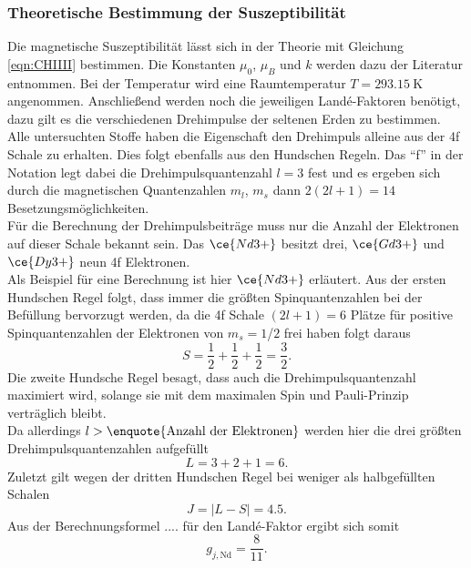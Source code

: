 \subsubsection{Theoretische Bestimmung der Suszeptibilität}

Die magnetische Suszeptibilität lässt sich in der Theorie mit Gleichung \eqref{eqn:CHIIII} bestimmen. Die Konstanten $\mu_0$, $\mu_B$ und $k$ werden dazu der Literatur \cite{lit2} entnommen.
Bei der Temperatur wird eine Raumtemperatur $T = \SI{293.15}{\kelvin}$ angenommen.
Anschließend werden noch die jeweiligen Landé-Faktoren benötigt, dazu gilt es die verschiedenen Drehimpulse der seltenen Erden zu bestimmen. Alle untersuchten Stoffe haben die Eigenschaft
den Drehimpuls alleine aus der 4f Schale zu erhalten. Dies folgt ebenfalls aus den Hundschen Regeln. Das \enquote{f} in der Notation legt dabei die Drehimpulsquantenzahl $l = 3$ fest und es ergeben sich
durch die magnetischen Quantenzahlen $m_l$, $m_s$ dann $2(2l+1) = 14$ Besetzungsmöglichkeiten. 
\\
Für die Berechnung der Drehimpulsbeiträge muss nur die Anzahl der Elektronen auf dieser Schale bekannt sein. Das $\ce{Nd3+}$ besitzt drei, $\ce{Gd3+}$ und $\ce{Dy3+}$ neun 4f Elektronen.
\\
Als Beispiel für eine Berechnung ist hier $\ce{Nd3+}$ erläutert.
Aus der ersten Hundschen Regel folgt, dass immer die größten Spinquantenzahlen bei der Befüllung bervorzugt werden, da die 4f Schale $(2l+1) = 6$ Plätze für positive Spinquantenzahlen der Elektronen
von $m_s = 1$/$2$ frei haben folgt daraus
\begin{equation}
S = \frac{1}{2} + \frac{1}{2} + \frac{1}{2} =  \frac{3}{2}.
\end{equation}
Die zweite Hundsche Regel besagt, dass auch die Drehimpulsquantenzahl maximiert wird, solange sie mit dem maximalen Spin und Pauli-Prinzip verträglich bleibt. 
\\
Da allerdings $l > \text{\enquote{Anzahl der Elektronen}}$
werden hier die drei größten Drehimpulsquantenzahlen aufgefüllt
\begin{equation}
    L = 3 + 2 + 1 =  6.
\end{equation}
Zuletzt gilt wegen der dritten Hundschen Regel bei weniger als halbgefüllten Schalen
\begin{equation}
    J = |L - S| = 4.5.
\end{equation}
Aus der Berechnungsformel .... für den Landé-Faktor ergibt sich somit
\begin{equation}
g_{j,\text{Nd}} = \frac{8}{11}.
\end{equation}
